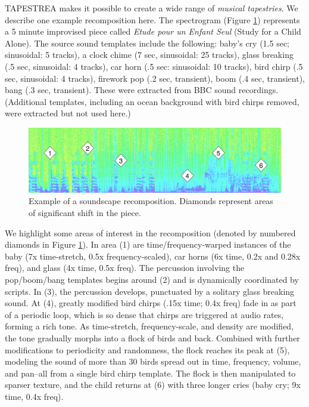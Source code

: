 \documentclass[10pt,letterpaper]{article}
\begin{document}
TAPESTREA makes it possible to create a wide range of {\it musical
tapestries}.  We describe one example recomposition here.  The
spectrogram (Figure \ref{fig:piece}) represents a 5 minute improvised
piece called \textit{Etude pour un Enfant Seul} (Study for a Child
Alone).  The source sound templates include the following: baby's cry
(1.5 sec; sinusoidal: 5 tracks), a clock chime (7 sec, sinusoidal: 25
tracks), glass breaking (.5 sec, sinusoidal: 4 tracks), car horn (.5
sec: sinusoidal: 10 tracks), bird chirp (.5 sec, sinusoidal: 4 tracks),
firework pop (.2 sec, transient), boom (.4 sec, transient), bang (.3
sec, transient).  These were extracted from BBC sound recordings. 
(Additional templates, including an ocean background with bird chirps
removed, were extracted but not used here.)

\begin{figure}[t]
  \begin{center}
    \includegraphics[width=1\columnwidth]{piece.pdf}
    \caption{Example of a soundscape recomposition.  Diamonds represent areas of significant
     shift in the piece.} 
    \label{fig:piece}
  \end{center}
\end{figure}

We highlight some areas of interest in the recomposition (denoted by
numbered diamonds in Figure \ref{fig:piece}).  In area (1) are
time/frequency-warped instances of the baby (7x time-stretch, 0.5x
frequency-scaled), car horns (6x time, 0.2x and 0.28x freq), and glass
(4x time, 0.5x freq).  The percussion involving the pop/boom/bang
templates begins around (2) and is dynamically coordinated by scripts.
In (3), the percussion develops, punctuated by a solitary glass breaking
sound. At (4), greatly modified bird chirps (.15x time; 0.4x freq) fade
in as part of a periodic loop, which is so dense that chirps are
triggered at audio rates, forming a rich tone.  As time-stretch,
frequency-scale, and density are modified, the tone gradually morphs
into a flock of birds and back.  Combined with further modifications to
periodicity and randomness, the flock reaches its peak at (5), modeling
the sound of more than 30 birds spread out in time, frequency, volume,
and pan--all from a single bird chirp template.  The flock is then
manipulated to sparser texture, and the child returns at (6) with three
longer cries (baby cry; 9x time, 0.4x freq).
\end{document}
